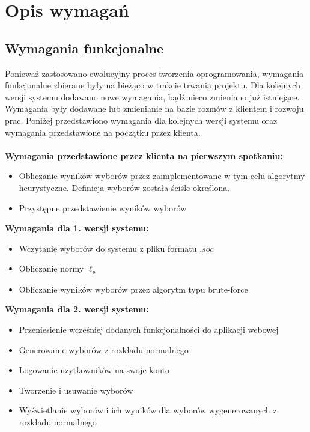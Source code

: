 \documentclass[pdflatex,11pt]{../aghdoc_version2}
\begin{document}
\section{Opis wymagań}
\subsection{Wymagania funkcjonalne}
Ponieważ zastosowano ewolucyjny proces tworzenia oprogramowania, wymagania
funkcjonalne zbierane były na bieżąco w trakcie trwania projektu. Dla kolejnych wersji
systemu dodawano nowe wymagania, bądź nieco zmieniano już istniejące. Wymagania były
dodawane lub zmienianie na bazie rozmów z klientem i rozwoju prac. Poniżej przedstawiono
wymagania dla kolejnych wersji systemu oraz wymagania przedstawione na początku przez
klienta. \\ \\
\textbf{Wymagania przedstawione przez klienta na pierwszym spotkaniu:}
\begin{itemize}
\item Obliczanie wyników wyborów przez zaimplementowane w tym celu algorytmy
heurystyczne. Definicja wyborów została ściśle określona.
\item Przystępne przedstawienie wyników wyborów
\end{itemize}
\vspace{\baselineskip}
\textbf{Wymagania dla 1. wersji systemu:}
\begin{itemize}

\item Wczytanie wyborów do systemu z pliku formatu $.soc$
\item Obliczanie normy $\ell_p$
\item Obliczanie wyników wyborów przez algorytm typu brute-force
\end{itemize}
\vspace{\baselineskip}
\textbf{Wymagania dla 2. wersji systemu:}
\begin{itemize}
\item Przeniesienie wcześniej dodanych funkcjonalności do aplikacji webowej
\item Generowanie wyborów z rozkładu normalnego
\item Logowanie użytkowników na swoje konto
\item Tworzenie i usuwanie wyborów
\item Wyświetlanie wyborów i ich wyników dla wyborów wygenerowanych z rozkładu
normalnego
\end{itemize}
\vspace{\baselineskip}
\end{document}
